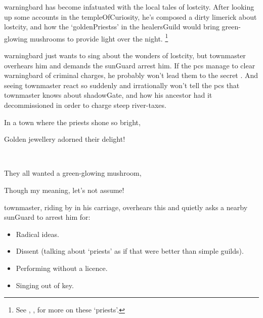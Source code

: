 \begin{exampletext}
  \Gls{warningbard} has become infatuated with the local tales of \gls{lostcity}.
  After looking up some accounts in the \gls{templeOfCuriosity}, he's composed a dirty limerick about \gls{lostcity}, and how the `\glspl{goldenPriests}' in the \gls{healersGuild} would bring green-glowing mushrooms to provide light over the night.%
  \footnote{See , , for more on these `priests'.}
\end{exampletext}

\Gls{warningbard} just wants to sing about the wonders of \gls{lostcity}, but \gls{townmaster} overhears him and demands the \gls{sunGuard} arrest him.
If the \glspl{pc} manage to clear \gls{warningbard} of criminal charges, he probably won't lead them to the secret .
And seeing \gls{townmaster} react so suddenly and irrationally won't tell the \glspl{pc} that \gls{townmaster} knows about \gls{shadowGate}, and how his ancestor had it decommissioned in order to charge steep river-taxes.

\begin{speechtext}
  In a town where the priests shone so bright,
  \textcolor{background}{\eighthnote~\raisebox{3pt}{\twonotes}}

  \noindent
  Golden jewellery adorned their delight!
  \textcolor{background}{\quarternote\raisebox{-4pt}{\eighthnote~}\eighthnote}

  \textcolor{background}{\twonotes~\raisebox{-12pt}{\twonotes}}

  \noindent
  They all wanted a green-glowing mushroom,
  \textcolor{background}{\eighthnote~\raisebox{2pt}{\quarternote}}

  \noindent
  Though my meaning, let's not assume!
  \textcolor{background}{\eighthnote~\raisebox{-7pt}{\quarternote}}

\end{speechtext}

\Gls{townmaster}, riding by in his carriage, overhears this and quietly asks a nearby \gls{sunGuard} to arrest him for:


\begin{itemize}
  \item
  Radical ideas.
  \item
  Dissent (talking about `priests' as if that were better than simple guilds).
  \item
  Performing without a licence.%
  \item
  Singing out of key.
\end{itemize}


